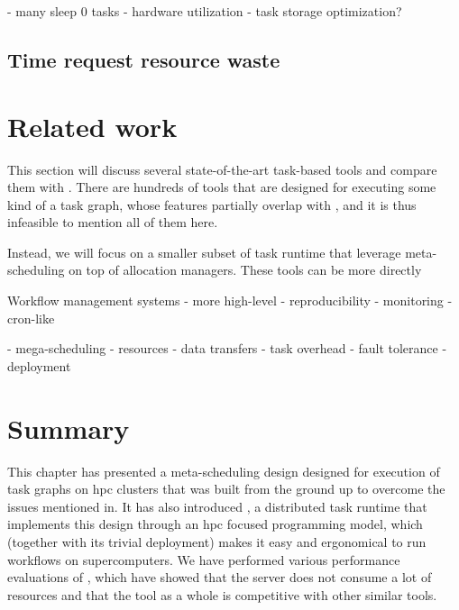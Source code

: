 - many sleep 0 tasks
- hardware utilization
- task storage optimization?
\subsection{Time request resource waste}

\section{Related work}
\label{hq:related-work}
This section will discuss several state-of-the-art task-based tools and compare them
with \hyperqueue{}. There are hundreds of tools that are designed for executing some kind
of a task graph, whose features partially overlap with \hyperqueue{}, and it is thus infeasible
to mention all of them here.

Instead, we will focus on a smaller subset of task runtime that leverage
meta-scheduling on top of allocation managers. These tools can be more directly

Workflow management systems - more high-level
- reproducibility
- monitoring
- cron-like


- mega-scheduling
- resources
- data transfers
- task overhead
- fault tolerance
- deployment

\section*{Summary}
This chapter has presented a meta-scheduling design designed for execution of task graphs on
\gls{hpc} clusters that was built from the ground up to overcome the issues mentioned
in. It has also introduced \hyperqueue{}, a distributed task
runtime that implements this design through an \gls{hpc} focused programming model,
which (together with its trivial deployment) makes it easy and ergonomical to run workflows on
supercomputers.  We have performed various performance evaluations%
of \hyperqueue{}, which have showed that the server does not consume a lot of resources
and that the tool as a whole is competitive with other similar tools.

